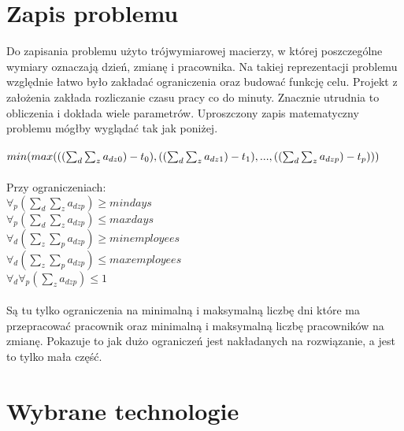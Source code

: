 \documentclass{article}
\begin{document}
\section{Zapis problemu}
     Do zapisania problemu użyto trójwymiarowej macierzy, w której poszczególne wymiary oznaczają dzień, zmianę i pracownika. Na takiej reprezentacji problemu względnie łatwo było zakładać ograniczenia oraz budować funkcję celu. Projekt z założenia zakłada rozliczanie czasu pracy co do minuty. Znacznie utrudnia to obliczenia i dokłada wiele parametrów. Uproszczony zapis matematyczny problemu mógłby wyglądać tak jak poniżej.\\
\\
  \begin{math} 
  min(max(((\sum_{d}^{ }\sum_{z}^{ }a_{dz0})-t_{0}),\\((\sum_{d}^{ }\sum_{z}^{ }a_{dz1})-t_{1}), ... , ((\sum_{d}^{ }\sum_{z}^{ }a_{dzp})-t_{p})))
  \end{math}
  \\ \\Przy ograniczeniach:\\
  \begin{math} 
  \forall_{p}(\sum_{d}^{ }\sum_{z}^{ }a_{dzp})\geqslant mindays
  \end{math}
  \\
  \begin{math} 
  \forall_{p}(\sum_{d}^{ }\sum_{z}^{ }a_{dzp})\leqslant maxdays
  \end{math}
  \\
  \begin{math} 
  \forall_{d}(\sum_{z}^{ }\sum_{p}^{ }a_{dzp})\geqslant minemployees
  \end{math}
  \\
  \begin{math} 
  \forall_{d}(\sum_{z}^{ }\sum_{p}^{ }a_{dzp})\leqslant maxemployees
  \end{math}
  \\
  \begin{math} 
  \forall_{d}\forall_{p}(\sum_{z}^{ }a_{dzp})\leqslant 1
  \end{math}
\\\\
Są tu tylko ograniczenia na minimalną i maksymalną liczbę dni które ma przepracować pracownik oraz minimalną i maksymalną liczbę pracowników na zmianę. Pokazuje to jak dużo ograniczeń jest nakładanych na rozwiązanie, a jest to tylko mała część. 

\section{Wybrane technologie}
\end{document}
